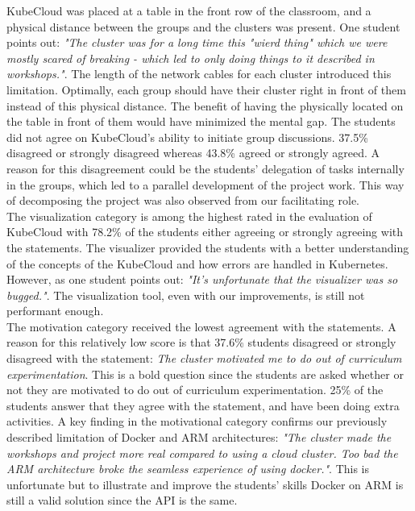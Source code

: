 \noindent
KubeCloud was placed at a table in the front row of the classroom, and a physical distance between the groups and the clusters was present. One student points out: \textit{"The cluster was for a long time this "wierd thing" which we were mostly scared of breaking - which led to only doing things to it described in workshops."}. The length of the network cables for each cluster introduced this limitation. Optimally, each group should have their cluster right in front of them instead of this physical distance. The benefit of having the physically located on the table in front of them would have minimized the mental gap. The students did not agree on KubeCloud's ability to initiate group discussions. 37.5\% disagreed or strongly disagreed whereas 43.8\% agreed or strongly agreed. A reason for this disagreement could be the students' delegation of tasks internally in the groups, which led to a parallel development of the project work. This way of decomposing the project was also observed from our facilitating role. \\

\noindent
The visualization category is among the highest rated in the evaluation of KubeCloud with 78.2\% of the students either agreeing or strongly agreeing with the statements. The visualizer provided the students with a better understanding of the concepts of the KubeCloud and how errors are handled in Kubernetes. However, as one student points out: \textit{"It's unfortunate that the visualizer was so bugged."}. The visualization tool, even with our improvements, is still not performant enough. \\

\noindent
The motivation category received the lowest agreement with the statements. A reason for this relatively low score is that 37.6\% students disagreed or strongly disagreed with the statement: \textit{The cluster motivated me to do out of curriculum experimentation}. This is a bold question since the students are asked whether or not they are motivated to do out of curriculum experimentation. 25\% of the students answer that they agree with the statement, and have been doing extra activities. A key finding in the motivational category confirms our previously described limitation of Docker and ARM architectures: \textit{"The cluster made the workshops and project more real compared to using a cloud cluster. Too bad the ARM architecture broke the seamless experience of using docker."}. This is unfortunate but to illustrate and improve the students' skills Docker on ARM is still a valid solution since the API is the same. \\

